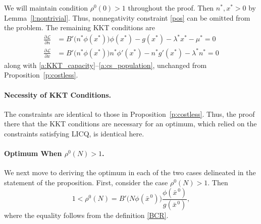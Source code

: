 \documentclass[12pt]{article}
\newcommand{\efficacy}{\phi}
\newcommand{\general}{g}
\newcommand{\benefit}{B}
\newcommand{\ratio}{\rho^0\!}
\newcommand{\xnobar}{\bar{x}^{\,0}}
\newcommand{\Lagrangian}{\mathscr{L}}
\begin{document}
We will maintain condition $\ratio(0) > 1$ throughout the proof. Then
$n^*, x^* > 0$ by Lemma~\ref{l:nontrivial}.  Thus,
nonnegativity constraint \eqref{pos} can be omitted from the
problem. The remaining KKT conditions are
\begin{align}
\frac{\partial \Lagrangian}{\partial n} & = \benefit' \! \bigl( n^* \efficacy(x^*) \bigr) \efficacy(x^*) - \general(x^*) - \lambda^* x^* - \mu^* = 0 \label{a:partial_L_partial_n_costly} \\
\frac{\partial \Lagrangian}{\partial x} & = \benefit' \! \bigl( n^* \efficacy(x^*) \bigr) n^* \efficacy'(x^*) - n^* \general'(x^*) - \lambda^* n^* = 0 \label{a:partial_L_partial_x_costly} 
\end{align}
along with \eqref{a:KKT_capacity}--\eqref{a:cs_population}, unchanged
from Proposition~\ref{p:costless}.

\paragraph{Necessity of KKT Conditions.}

The constraints are identical to those in
Proposition~\ref{p:costless}. Thus, the proof there that the KKT
conditions are necessary for an optimum, which relied on the
constraints satisfying LICQ, is identical here.

\paragraph{Optimum When $\ratio(N) > 1$.}

We next move to deriving the optimum in each of the two cases
delineated in the statement of the proposition. First, consider the
case $\ratio(N) > 1$. Then
\begin{equation}
\label{a:costly1}
1 < \ratio(N) = \benefit' \! \big( N \efficacy(\xnobar) \bigr)
\frac{\efficacy(\xnobar)}{\general(\xnobar)},
\end{equation}
where the equality follows from the definition \eqref{BCR}. 
\end{document}
